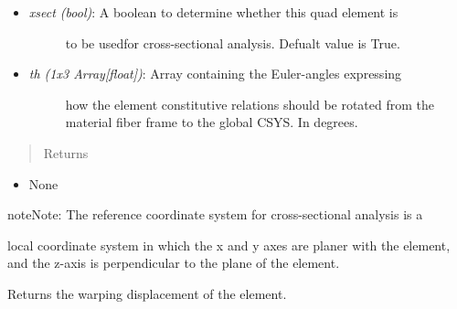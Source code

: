 \documentclass[letterpaper,10pt,english]{sphinxmanual}
\begin{document}
\begin{fulllineitems}
\begin{fulllineitems}
\begin{itemize}
\item {} \begin{description}
\item[{\emph{xsect (bool)}: A boolean to determine whether this quad element is}] \leavevmode
to be usedfor cross-sectional analysis. Defualt value is True.

\end{description}

\item {} \begin{description}
\item[{\emph{th (1x3 Array{[}float{]})}: Array containing the Euler-angles expressing}] \leavevmode
how the element constitutive relations should be rotated from
the material fiber frame to the global CSYS. In degrees.

\end{description}

\end{itemize}
\begin{quote}\begin{description}
\item[{Returns}] \leavevmode
\end{description}\end{quote}
\begin{itemize}
\item {} 
None

\end{itemize}

\begin{notice}{note}{Note:}
The reference coordinate system for cross-sectional analysis is a
\end{notice}

local coordinate system in which the x and y axes are planer with the
element, and the z-axis is perpendicular to the plane of the element.

\end{fulllineitems}


\begin{fulllineitems}
\label{structures:AeroComBAT.Structures.CQUAD4.getDeformed}
Returns the warping displacement of the element.


\end{fulllineitems}
\end{fulllineitems}
\end{document}
